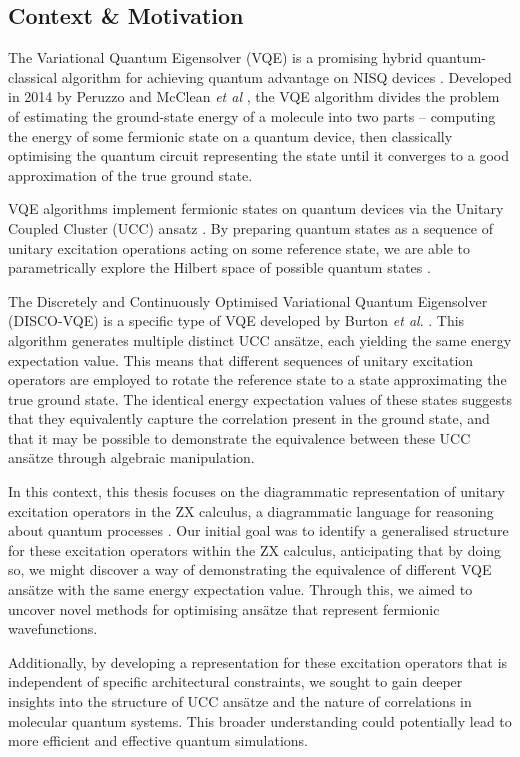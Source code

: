 \subsection{Context \& Motivation}%
\label{context-motivation}

The Variational Quantum Eigensolver (VQE) is a promising hybrid quantum-classical algorithm for achieving quantum advantage on NISQ devices \cite{Cerezo2020}. Developed in 2014 by Peruzzo and McClean \textit{et al} \cite{Peruzzo2014}, the VQE algorithm divides the problem of estimating the ground-state energy of a molecule into two parts -- computing the energy of some fermionic state on a quantum device, then classically optimising the quantum circuit representing the state until it converges to a good approximation of the true ground state.

VQE algorithms implement fermionic states on quantum devices via the Unitary Coupled Cluster (UCC) ansatz \cite{Taube2006}. By preparing quantum states as a sequence of unitary excitation operations acting on some reference state, we are able to parametrically explore the Hilbert space of possible quantum states \cite{McClean2016}.

The Discretely and Continuously Optimised Variational Quantum Eigensolver (DISCO-VQE) is a specific type of VQE developed by Burton \textit{et al}. \cite{Burton2023}. This algorithm generates multiple distinct UCC ansätze, each yielding the same energy expectation value. This means that different sequences of unitary excitation operators are employed to rotate the reference state to a state approximating the true ground state. The identical energy expectation values of these states suggests that they equivalently capture the correlation present in the ground state, and that it may be possible to demonstrate the equivalence between these UCC ansätze through algebraic manipulation.

In this context, this thesis focuses on the diagrammatic representation of unitary excitation operators in the ZX calculus, a diagrammatic language for reasoning about quantum processes \cite{Coecke2011}. Our initial goal was to identify a generalised structure for these excitation operators within the ZX calculus, anticipating that by doing so, we might discover a way of demonstrating the equivalence of different VQE ansätze with the same energy expectation value. Through this, we aimed to uncover novel methods for optimising ansätze that represent fermionic wavefunctions.

Additionally, by developing a representation for these excitation operators that is independent of specific architectural constraints, we sought to gain deeper insights into the structure of UCC ansätze and the nature of correlations in molecular quantum systems. This broader understanding could potentially lead to more efficient and effective quantum simulations.

